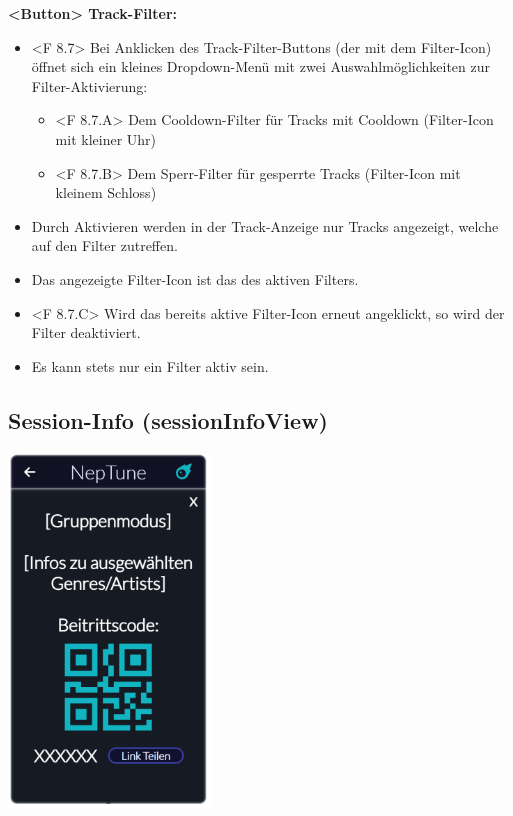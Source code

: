 \documentclass[oneside, ngerman]{sdqtechreport}
\begin{document}
\textbf{<Button> Track-Filter:}
\begin{itemize}
    \hypertarget{<F 8.7>}{}
    \item <F 8.7> Bei Anklicken des Track-Filter-Buttons (der mit dem Filter-Icon) öffnet sich ein kleines Dropdown-Menü mit zwei Auswahlmöglichkeiten zur Filter-Aktivierung:
    \begin{itemize}
        \hypertarget{<F 8.7.A>}{}
        \item <F 8.7.A> Dem Cooldown-Filter für Tracks mit Cooldown (Filter-Icon mit kleiner Uhr)
        \hypertarget{<F 8.7.B>}{}
        \item <F 8.7.B> Dem Sperr-Filter für gesperrte Tracks (Filter-Icon mit kleinem Schloss)
    \end{itemize}
    \item Durch Aktivieren werden in der Track-Anzeige nur Tracks angezeigt, welche auf den Filter zutreffen.
    \item Das angezeigte Filter-Icon ist das des aktiven Filters.
    \hypertarget{<F 8.7.C>}{}
    \item <F 8.7.C> Wird das bereits aktive Filter-Icon erneut angeklickt, so wird der Filter deaktiviert.
    \item Es kann stets nur ein Filter aktiv sein.
\end{itemize}


\subsection{Session-Info (sessionInfoView)}
\label{sec:Benutzeroberfläche:sessionInfoView}

\begin{center}
    \hypertarget{sessionInfoView}{}
    \includegraphics[width=0.4\textwidth]{LATEX/Pflichtenheft/GraphicDesigns/shareLinkPopUpPage.png}
\end{center}
\end{document}
